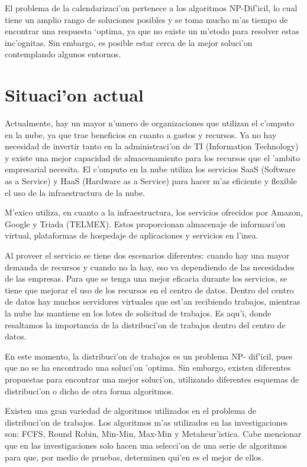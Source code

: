 El problema de la calendarizaci'on pertenece a los algoritmos NP-Dif'icil, lo cual tiene un amplio rango de soluciones posibles y se toma mucho m'as tiempo de encontrar una respuesta ‘optima, ya que no existe un m'etodo para resolver estas inc'ognitas. Sin embargo, es posible estar cerca de la mejor soluci'on contemplando algunos entornos.\cite{shimpy2014different}

\section*{Situaci'on actual}

Actualmente, hay un mayor n'umero de organizaciones que utilizan el c'omputo en la nube, ya que trae beneficios en cuanto a gastos y recursos. Ya no hay necesidad de invertir tanto en la administraci'on de TI (Information Technology) y existe una mejor capacidad de almacenamiento para los recursos que el 'ambito empresarial necesita.
El c'omputo en la nube utiliza los servicios SaaS (Software as a Service) y HaaS (Hardware as a Service) para hacer m'as eficiente y flexible el uso de la infraestructura de la nube. \cite{mariscal2013computo}

M'exico utiliza, en cuanto a la infraestructura, los servicios ofrecidos por Amazon, Google y Triada (TELMEX). Estos proporcionan almacenaje de informaci'on virtual, plataformas de hospedaje de aplicaciones y servicios en l'inea.\cite{mariscal2013computo} 

Al proveer el servicio se tiene dos escenarios diferentes: cuando hay una mayor demanda de recursos y cuando no la hay,  eso va dependiendo de las necesidades de las empresas. 
Para que se tenga una mejor eficacia durante los servicios, se tiene que mejorar el uso de los recursos en el centro de datos. Dentro del centro de datos hay muchos servidores virtuales que est'an recibiendo trabajos, mientras la nube las mantiene en los lotes de solicitud de trabajos. Es aqu'i, donde resaltamos la importancia de la distribuci'on de trabajos dentro del centro de datos. \cite{shimpy2014different}

En este momento, la distribuci'on de trabajos es un problema NP- dif'icil, pues que no se ha encontrado una soluci'on 'optima. Sin embargo, existen diferentes propuestas para encontrar una mejor soluci'on, utilizando diferentes esquemas de distribuci'on o dicho de otra forma algoritmos. \cite{shimpy2014different}

Existen una gran variedad de algoritmos utilizados en el problema de distribuci'on de trabajos. Los algoritmos m'as utilizados en las investigaciones son: FCFS, Round Robin, Min-Min, Max-Min y Metaheur'istica. Cabe mencionar que en las investigaciones solo hacen una selecci'on de una serie de algoritmos para que, por medio de pruebas, determinen qui'en es el mejor de ellos. 

